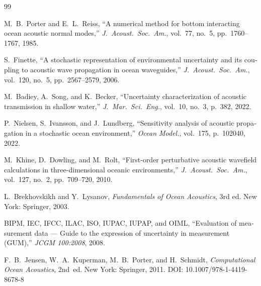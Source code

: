 \documentclass[12pt,a4paper]{article}
\begin{document}
\begin{thebibliography}{99}

\begin{english}
M.~B.~Porter and E.~L.~Reiss,
``A numerical method for bottom interacting ocean acoustic normal modes,''
\textit{J.\ Acoust.\ Soc.\ Am.}, vol.~77, no.~5, pp.~1760--1767, 1985.
\end{english}

\begin{english}
S.~Finette,
``A stochastic representation of environmental uncertainty and its coupling to
acoustic wave propagation in ocean waveguides,''
\textit{J.\ Acoust.\ Soc.\ Am.}, vol.~120, no.~5, pp.~2567--2579, 2006.
\end{english}

\begin{english}
M.~Badiey, A.~Song, and K.~Becker,
``Uncertainty characterization of acoustic transmission in shallow water,''
\textit{J.\ Mar.\ Sci.\ Eng.}, vol.~10, no.~3, p.~382, 2022.
\end{english}

\begin{english}
P.~Nielsen, S.~Ivansson, and J.~Lundberg,
``Sensitivity analysis of acoustic propagation in a stochastic ocean environment,''
\textit{Ocean Model.}, vol.~175, p.~102040, 2022.
\end{english}

\begin{english}
M.~Khine, D.~Dowling, and M.~Rolt,
``First-order perturbative acoustic wavefield calculations in three-dimensional
oceanic environments,''
\textit{J.\ Acoust.\ Soc.\ Am.}, vol.~127, no.~2, pp.~709--720, 2010.
\end{english}

\begin{english}
L.~Brekhovskikh and Y.~Lysanov,
\textit{Fundamentals of Ocean Acoustics}, 3rd ed.
New York: Springer, 2003.
\end{english}

\begin{english}
BIPM, IEC, IFCC, ILAC, ISO, IUPAC, IUPAP, and OIML,
``Evaluation of measurement data --- Guide to the expression of uncertainty in
measurement (GUM),'' \textit{JCGM 100:2008}, 2008.
\end{english}

\begin{english}
F.~B.~Jensen, W.~A.~Kuperman, M.~B.~Porter, and H.~Schmidt,
\textit{Computational Ocean Acoustics}, 2nd~ed.
New York: Springer, 2011.
\textenglish{DOI: 10.1007/978-1-4419-8678-8}
\end{english}

\end{thebibliography}
\end{document}
